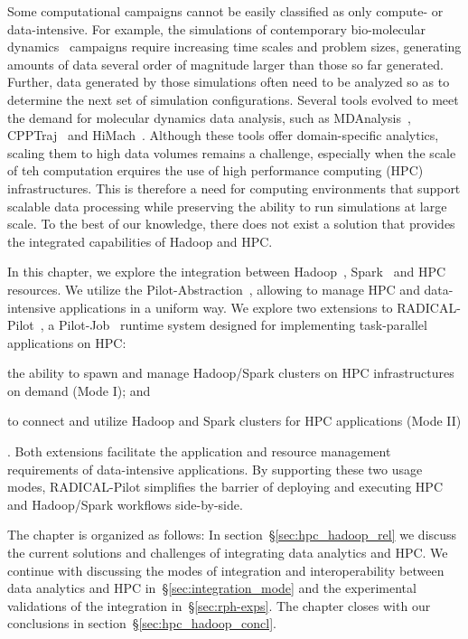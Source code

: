 Some computational campaigns cannot be easily classified as only compute- or
data-intensive. For example, the simulations of contemporary bio-molecular
dynamics~\cite{dror2012biomolecular} campaigns require increasing time scales
and problem sizes,  generating amounts of data several order of magnitude larger
than those so far generated. Further, data generated by those simulations often
need to be analyzed so as to determine the next set of simulation
configurations. Several tools evolved to meet the demand for molecular dynamics
data analysis, such as
MDAnalysis~\cite{michaud2011mdanalysis,gowers2016mdanalysis},
CPPTraj~\cite{roe2013ptraj} and HiMach~\cite{tiankai2008scalable}. Although
these tools offer domain-specific analytics, scaling them to high data volumes
remains a challenge, especially when the scale of teh computation erquires the
use of high performance computing (HPC) infrastructures. This is therefore a
need for computing environments that support scalable data processing while
preserving the ability to run simulations at large scale. To the best of our
knowledge, there does not exist a solution that provides the integrated
capabilities of Hadoop and HPC.

In this chapter, we explore the integration between Hadoop~\cite{hadoop},
Spark~\cite{zaharia2010spark} and HPC resources. We utilize the
Pilot-Abstraction~\cite{luckow2012pstar}, allowing to manage HPC and
data-intensive applications in a uniform way. We explore two extensions to
RADICAL-Pilot~\cite{merzky2018design}, a Pilot-Job~\cite{luckow2012pstar}
runtime system designed for implementing task-parallel applications on HPC:
\begin{inparaenum}[1)]
    \item the ability to spawn and manage Hadoop/Spark clusters on HPC infrastructures on demand (Mode I); and
    \item to connect and utilize Hadoop and Spark clusters for HPC applications
    (Mode II)
\end{inparaenum}.
Both extensions facilitate the application and
resource management requirements of data-intensive applications. By supporting
these two usage modes, RADICAL-Pilot simplifies the barrier of deploying and
executing HPC and Hadoop/Spark workflows side-by-side.

The chapter is organized as follows: In section~\S\ref{sec:hpc_hadoop_rel} we
discuss the current solutions and challenges of integrating data analytics and
HPC. We continue with discussing the modes of integration and interoperability
between data analytics and HPC in~\S\ref{sec:integration_mode} and the
experimental validations of the integration in~\S\ref{sec:rph-exps}. The chapter
closes with our conclusions in section~\S\ref{sec:hpc_hadoop_concl}.


